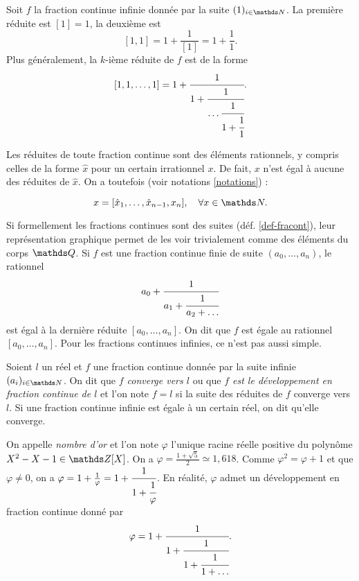 \begin{exemple}
	Soit $f$ la fraction continue infinie donnée par la suite $(1)_{i\in \N}$.
	La première réduite est $[1] = 1$, la deuxième est \[[1, 1] = 1 +
	\frac{1}{[1]} = 1 + \frac{1}{1}.\] Plus généralement, la $k$-ième réduite
	de $f$ est de la forme \[[1, 1, \dots, 1] = 1 + \cfrac{1}{1 +
	\cfrac{1}{\dots \\ \cfrac{1}{1 + \cfrac{1}{1}}}}.\]
\end{exemple}

Les réduites de toute fraction continue sont des éléments rationnels, y compris
celles de la forme $\hat{x}$ pour un certain irrationnel $x$. De fait, $x$ n'est
égal à aucune des réduites de $\hat{x}$. On a toutefois (voir notations
\ref{notations}) :

\begin{equation} \label{egalite-reduite}
	x = [\hat{x}_1, \dots, \hat{x}_{n-1}, x_n], \quad \forall x\in \N.
\end{equation}

Si formellement les fractions continues sont des suites (déf.
\ref{def-fracont}), leur représentation graphique permet de les voir
trivialement comme des éléments du corps $\Q$. Si $f$ est une fraction continue
finie de suite $(a_0, \dots, a_n)$, le rationnel \[a_0 + \cfrac{1}{a_1 +
\cfrac{1}{a_2 + \dots}}\] est égal à la dernière réduite $[a_0, \dots, a_n]$.
On dit que $f$ est égale au rationnel $[a_0, \dots, a_n]$. Pour les fractions
continues infinies, ce n'est pas aussi simple.

\begin{definition}
	Soient $l$ un réel et $f$ une fraction continue donnée par la suite infinie
	$(a_i)_{i\in \N}$. On dit que \emph{$f$ converge vers $l$} ou que \emph{$f$
	est le développement en fraction continue de $l$} et l'on note $f = l$ si
	la suite des réduites de $f$ converge vers $l$. Si une fraction continue
	infinie est égale à un certain réel, on dit qu'elle converge.
\end{definition}

\begin{exemple}[Nombre d'or]
	On appelle \emph{nombre d'or} et l'on note $\varphi$ l'unique racine réelle
	positive du polynôme $X^2 - X - 1 \in \Z[X]$. On a $\varphi =\frac{1 +
	\sqrt{5}}{2} \simeq 1, 618$. Comme $\varphi^2 = \varphi + 1$ et que
	$\varphi \neq 0$, on a $\varphi = 1 + \frac{1}{\varphi} = 1 + \cfrac{1}{1 +
	\cfrac{1}{\varphi}}$. En réalité, $\varphi$ admet un développement en
	fraction continue donné par \[\varphi = 1 + \cfrac{1}{1 + \cfrac{1}{1 +
	\cfrac{1}{1 + \dots}}}.\]
\end{exemple}


